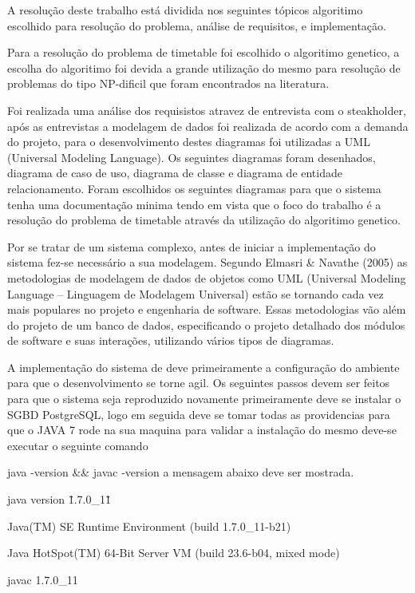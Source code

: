 





A resolução deste trabalho está dividida nos seguintes tópicos algoritimo escolhido para resolução do problema, análise de requisitos, e implementação.\par


Para a resolução do problema de timetable foi escolhido o algoritimo genetico, a escolha do algoritimo foi devida a grande utilização do mesmo para resolução de problemas do tipo NP-dificil que foram encontrados na literatura.
\par

Foi realizada uma análise dos requisistos atravez de entrevista com o steakholder, após as entrevistas a modelagem de dados foi realizada de acordo com a demanda do projeto, para o desenvolvimento destes diagramas foi utilizadas a UML (Universal Modeling Language). Os seguintes diagramas foram desenhados, diagrama de caso de uso, diagrama de classe e diagrama de entidade relacionamento. Foram escolhidos os seguintes diagramas para que o sistema tenha uma documentação minima tendo em vista que o foco do trabalho é a resolução do problema de timetable através da utilização do algoritimo genetico.

Por se tratar de um sistema complexo, antes de iniciar a implementação do sistema
fez-se necessário a sua modelagem. Segundo Elmasri & Navathe (2005) as metodologias
de modelagem de dados de objetos como UML (Universal Modeling Language –
Linguagem de Modelagem Universal) estão se tornando cada vez mais populares no
projeto e engenharia de software. Essas metodologias vão além do projeto de um banco de
dados, especificando o projeto detalhado dos módulos de software e suas interações,
utilizando vários tipos de diagramas.


\par


A implementação do sistema de deve primeiramente a configuração do ambiente para que o desenvolvimento se torne agil. Os seguintes passos devem ser feitos para que o sistema seja reproduzido novamente primeiramente deve se instalar o SGBD PostgreSQL, logo em seguida deve se tomar todas as providencias para que o JAVA 7 rode na sua maquina para validar a instalação do mesmo deve-se executar o seguinte comando 

java -version && javac -version a mensagem abaixo deve ser mostrada.

java version \"1.7.0_11\"\par
Java(TM) SE Runtime Environment (build 1.7.0_11-b21)\par
Java HotSpot(TM) 64-Bit Server VM (build 23.6-b04, mixed mode)\par
javac 1.7.0_11\par


